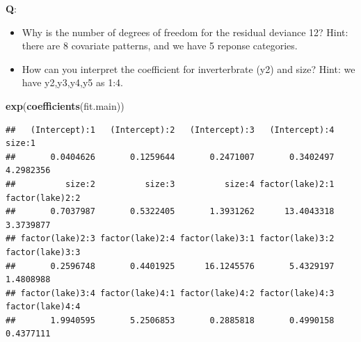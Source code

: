 \documentclass[
  ignorenonframetext,
]{beamer}
\newenvironment{Shaded}{\begin{snugshade}}{\end{snugshade}}
\newcommand{\FunctionTok}[1]{\textcolor[rgb]{0.13,0.29,0.53}{\textbf{#1}}}
\newcommand{\NormalTok}[1]{#1}
\providecommand{\tightlist}{%
  \setlength{\itemsep}{0pt}\setlength{\parskip}{0pt}}
\begin{document}
\begin{frame}[fragile]
\normalsize

\textbf{Q}:

\begin{itemize}
\tightlist
\item
  Why is the number of degrees of freedom for the residual deviance 12?
  Hint: there are 8 covariate patterns, and we have 5 reponse
  categories.
\item
  How can you interpret the coefficient for inverterbrate (y2) and size?
  Hint: we have y2,y3,y4,y5 as 1:4.
\end{itemize}

\small

\begin{Shaded}
\begin{Highlighting}[]
\FunctionTok{exp}\NormalTok{(}\FunctionTok{coefficients}\NormalTok{(fit.main))}
\end{Highlighting}
\end{Shaded}

\begin{verbatim}
##   (Intercept):1   (Intercept):2   (Intercept):3   (Intercept):4          size:1 
##       0.0404626       0.1259644       0.2471007       0.3402497       4.2982356 
##          size:2          size:3          size:4 factor(lake)2:1 factor(lake)2:2 
##       0.7037987       0.5322405       1.3931262      13.4043318       3.3739877 
## factor(lake)2:3 factor(lake)2:4 factor(lake)3:1 factor(lake)3:2 factor(lake)3:3 
##       0.2596748       0.4401925      16.1245576       5.4329197       1.4808988 
## factor(lake)3:4 factor(lake)4:1 factor(lake)4:2 factor(lake)4:3 factor(lake)4:4 
##       1.9940595       5.2506853       0.2885818       0.4990158       0.4377111
\end{verbatim}

\normalsize
\end{frame}
\end{document}
